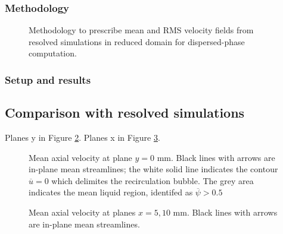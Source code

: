 \subsubsection{Methodology}


\begin{figure}[h!]	
	\centering
	\caption{Methodology to prescribe mean and RMS velocity fields from resolved simulations in reduced domain for dispersed-phase computation.}
	\label{fig:custom_inlet_methodology}
\end{figure}


\subsubsection{Setup and results}




\subsection{Comparison with resolved simulations}

Planes y in Figure \ref{fig:JICF_lgs_gaseous_conditions_comparison_plane_y}. Planes x in Figure \ref{fig:JICF_lgs_gaseous_conditions_comparison_planes_x}. 

\begin{figure}[ht]
\centering
\caption[Mean axial velocity at plane $y = 0$ mm.]{Mean axial velocity at plane $y = 0$ mm. Black lines with arrows are in-plane mean streamlines; the white solid line indicates the contour $\overline{u} = 0$ which delimites the recirculation bubble. The grey area  indicates the mean liquid region, identifed as $\overline{\psi} > 0.5$}
\label{fig:JICF_lgs_gaseous_conditions_comparison_plane_y}
\end{figure}


\begin{figure}[ht]
\centering
\caption[Mean axial velocity at planes $x = 5, 10$ mm]{Mean axial velocity at planes $x = 5, 10$ mm. Black lines with arrows are in-plane mean streamlines.}
\label{fig:JICF_lgs_gaseous_conditions_comparison_planes_x}
\end{figure}

